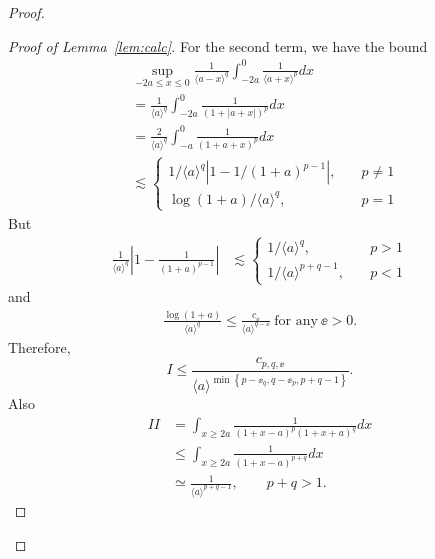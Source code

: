 \begin{proof}
\begin{proof}[Proof of Lemma~\ref{lem:calc}]
%
For the second term, we have the bound
%
%
\begin{equation*}
\begin{split}
  & \sup_{-2a \le x \le 0} \frac{1}{\langle a - x \rangle
  ^{q}} \int_{-2a}^{0} \frac{1}{\langle a + x \rangle ^{p}} d x
  \\
  & = \frac{1}{\langle a \rangle ^{q}} \int_{-2a}^{0} \frac{1}{(1 + | a +
  x
  |)^{p}} d x 
  \\
  & = \frac{2}{\langle a \rangle ^{q}} \int_{-a}^{0} \frac{1}{(1 + a +
  x)^{p}} d x
  \\
  & \lesssim
  \begin{cases}
    1/{\langle a \rangle ^{q}} \left| 1 - 1/{(1 +
    a)^{p -1}} \right|, \quad & p \neq 1
    \\
    \log(1+a)/{\langle a \rangle^{q} }, \quad & p =1
  \end{cases}
  \end{split}
\end{equation*}
%
But
%
%
\begin{equation*}
\begin{split}
\frac{1}{\langle a \rangle ^{q}}\left| 1 - \frac{1}{(1 +
    a)^{p -1}} \right|
    & \lesssim
    \begin{cases}
      1/{\langle a \rangle ^{q}}, \quad & p > 1
      \\
      1/{\langle a \rangle ^{p + q -1}}, \quad & p < 1
    \end{cases}
\end{split}
\end{equation*}
%
%
and
%
%
\begin{equation*}
\begin{split}
  \frac{\log(1 + a)}{\langle a \rangle^{q} } \le  \frac{c_{\ee}}{\langle a
    \rangle ^{q - \ee}} \ \text{for any} \ \ee > 0.
\end{split}
\end{equation*}
%
%
%
Therefore,
\begin{equation*}
  I \le  \frac{c_{p,q, \ee}}{\langle a \rangle ^{\min\left\{ p-\ee_{q}, q -\ee_{p}, p + q-1 \right\}}}.
\end{equation*}
%
%
Also
%
%
\begin{equation*}
\begin{split}
  II 
    & = \int_{x \ge 2a} \frac{1}{(1 + x - a)^{p} (1 + x +
  a)^{q}} d x
  \\
  & \le \int_{x \ge 2a} \frac{1}{(1 + x -a)^{p+q}} d x
  \\
  & \simeq \frac{1}{\langle a \rangle^{p+q -1}}, \qquad p + q > 1.

\end{split}
\end{equation*}
\end{proof}
\end{proof}
